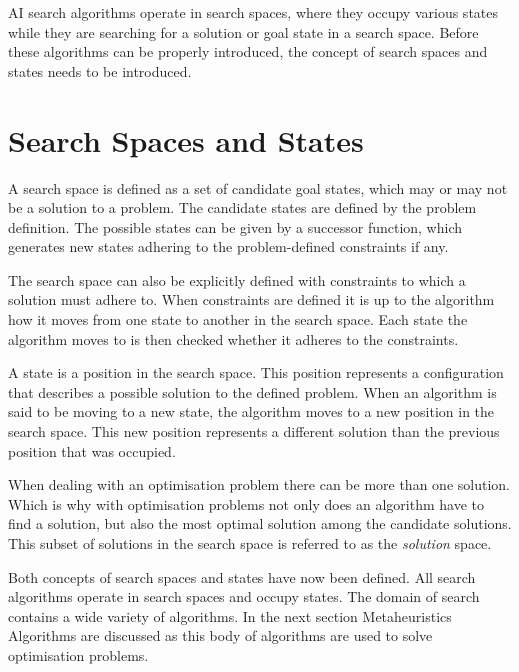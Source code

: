 \gls{AI} search algorithms operate in search spaces, where they occupy various states while they are searching for a solution or goal state in a search space. Before these algorithms can be properly introduced, the concept of search spaces and states needs to be introduced.

\section{Search Spaces and States}
A search space is defined as a set of candidate goal states, which may or may not be a solution to a problem\cite{AIModernApproach}. The candidate states are defined by the problem definition\cite{AIModernApproach}. The possible states can be given by a successor function, which generates new states adhering to the problem-defined constraints if any\cite{AIModernApproach}. 

The search space can also be explicitly defined with constraints to which a solution must adhere to\cite{AIModernApproach}. When constraints are defined it is up to the algorithm how it moves from one state to another in the search space\cite{AIModernApproach}. Each state the algorithm moves to is then checked whether it adheres to the constraints\cite{AIModernApproach}.

A state is a position in the search space\cite{AIModernApproach}. This position represents a configuration that describes a possible solution to the defined problem\cite{AIModernApproach}. When an algorithm is said to be moving to a new state, the algorithm moves to a new position in the search space\cite{AIModernApproach}. This new position represents a different solution than the previous position that was occupied\cite{AIModernApproach}.

When dealing with an optimisation problem there can be more than one solution\cite{AIModernApproach}. Which is why with optimisation problems not only does an algorithm have to find a solution, but also the most optimal solution among the candidate solutions\cite{AIModernApproach}. This subset of solutions in the search space is referred to as the \emph{solution} space.

Both concepts of search spaces and states have now been defined. All search algorithms operate in search spaces and occupy states. The domain of search contains a wide variety of algorithms. In the next section Metaheuristics Algorithms are discussed as this body of algorithms are used to solve optimisation problems.

